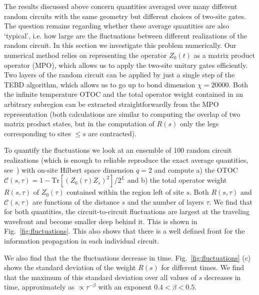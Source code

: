 \documentclass[aps,prb,twocolumn,superscriptaddress]{revtex4-1}
\begin{document}
The results discussed above concern quantities averaged over many different random circuits with the same geometry but different choices of two-site gates. The question remains regarding whether these average quantities are also `typical', i.e. how large are the fluctuations between different realizations of the random circuit. In this section we investigate this problem numerically. Our numerical method relies on representing the operator $Z_0(t)$ as a matrix product operator (MPO), which allows us to apply the two-site unitary gates efficiently. Two layers of the random circuit can be applied by just a single step of the TEBD algorithm, which allows us to go up to bond dimension $\chi = 20000$. Both the infinite temperature OTOC and the total operator weight contained in an arbitrary subregion can be extracted straightforwardly from the MPO representation (both calculations are similar to computing the overlap of two matrix product states, but in the computation of $R(s)$ only the legs corresponding to sites $\leq s$ are contracted).

To quantify the fluctuations we look at an ensemble of 100 random circuit realizations (which is enough to reliable reproduce the exact average quantities, see~) with on-site Hilbert space dimension $q=2$ and compute a) the OTOC $\mathcal{C}(s,\tau) = 1-\mathrm{Tr}[(Z_0(\tau)Z_s)^2 ]/ 2^L$ and b) the total operator weight $R(s,\tau)$ of $Z_0(\tau)$ contained within the region left of site $s$. Both $R(s,\tau)$ and $\mathcal{C}(s,\tau)$ are functions of the distance $s$ and the number of layers $\tau$. We find that for both quantities, the circuit-to-circuit fluctuations are largest at the traveling wavefront and become smaller deep behind it. This is shown in Fig.~\ref{fig:fluctuations}. This also shows that there is a well defined front for the information propagation in each individual circuit.
 
We also find that the the fluctuations decrease in time. Fig.~\ref{fig:fluctuations} (c) shows the standard deviation of the weight $R(s)$ for different times. We find that the maximum of this standard deviation over all values of $s$ decreases in time, approximately as $\propto \tau^{-\beta}$ with an exponent $0.4<\beta<0.5$. 
\end{document}
